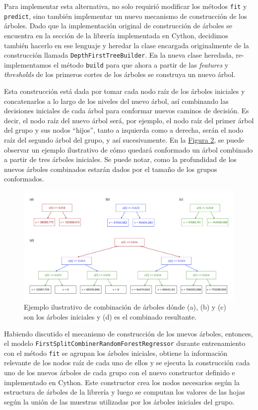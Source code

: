 Para implementar esta alternativa, no solo requirió modificar los métodos \texttt{fit} y \texttt{predict}, sino también implementar un nuevo mecanismo de construcción de los árboles. Dado que la implementación original de construcción de árboles se encuentra en la sección de la librería implementada en Cython, decidimos también hacerlo en ese lenguaje y heredar la clase encargada originalmente de la construcción llamada \texttt{DepthFirstTreeBuilder}. En la nueva clase heredada, re-implementamos el método \texttt{build} para que ahora a partir de las \textit{features} y \textit{thresholds} de los primeros cortes de los árboles se construya un nuevo árbol.

Esta construcción está dada por tomar cada nodo raíz de los árboles iniciales y concatenarlos a lo largo de los niveles del nuevo árbol, así combinando las decisiones iniciales de cada árbol para conformar nuevos caminos de decisión. Es decir, el nodo raíz del nuevo árbol será, por ejemplo, el nodo raíz del primer árbol del grupo y sus nodos “hijos”, tanto a izquierda como a derecha, serán el nodo raíz del segundo árbol del grupo, y así sucesivamente. En la \hyperref[figure2]{Figura 2}, se puede observar un ejemplo ilustrativo de cómo quedará conformado un árbol combinado a partir de tres árboles iniciales. Se puede notar, como la profundidad de los nuevos árboles combinados estarán dados por el tamaño de los grupos conformados.

\begin{figure}[h]
\centering
    \includegraphics[width=1\textwidth]{figures/marco-metodologico/FSC.png}
\caption{Ejemplo ilustrativo de combinación de árboles dónde (a), (b) y (c) son los árboles iniciales y (d) es el combinado resultante.}
\end{figure}
\label{figure2}

Habiendo discutido el mecanismo de construcción de los nuevos árboles, entonces, el modelo \texttt{FirstSplitCombinerRandomForestRegressor} durante entrenamiento con el método \texttt{fit} se agrupan los árboles iniciales, obtiene la información relevante de los nodos raíz de cada uno de ellos y se ejecuta la construcción cada uno de los nuevos árboles de cada grupo con el nuevo constructor definido e implementado en Cython. Este constructor crea los nodos necesarios según la estructura de árboles de la librería y luego se computan los valores de las hojas según la unión de las muestras utilizadas por los árboles iniciales del grupo.

